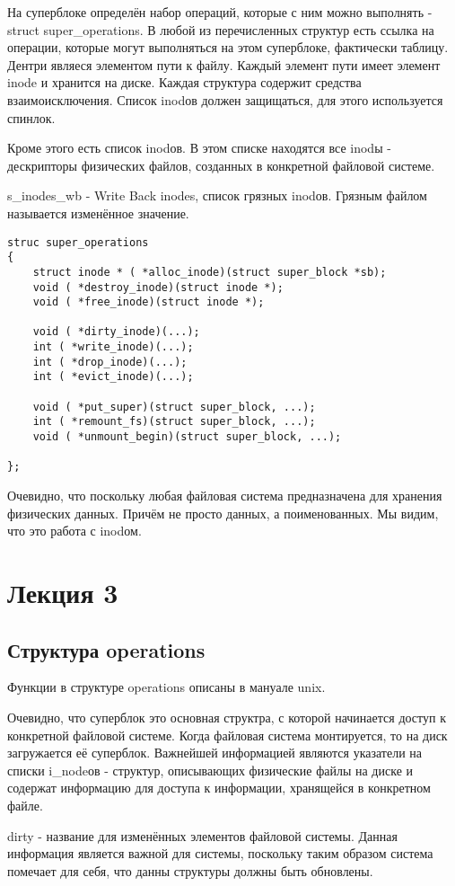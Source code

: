 На суперблоке определён набор операций, которые с ним можно выполнять - struct super\_operations. В любой из перечисленных структур есть ссылка на операции, которые могут выполняться на этом суперблоке, фактически таблицу. Дентри являеся элементом пути к файлу. Каждый элемент пути имеет элемент inode и хранится на диске. Каждая структура содержит средства взаимоисключения. Список inodов должен защищаться, для этого используется спинлок.

Кроме этого есть список inodов. В этом списке находятся все inodы - дескрипторы физических файлов, созданных в конкретной файловой системе. 

s\_inodes\_wb - Write Back inodes, список грязных inodов. Грязным файлом называется изменённое значение.\\
\begin{lstlisting}
struc super_operations
{
	struct inode * ( *alloc_inode)(struct super_block *sb);
	void ( *destroy_inode)(struct inode *);
	void ( *free_inode)(struct inode *);

	void ( *dirty_inode)(...);
	int ( *write_inode)(...);
	int ( *drop_inode)(...);
	int ( *evict_inode)(...);

	void ( *put_super)(struct super_block, ...);
	int ( *remount_fs)(struct super_block, ...);
	void ( *unmount_begin)(struct super_block, ...);
	
};
\end{lstlisting}

Очевидно, что поскольку любая файловая система предназначена для хранения физических данных. Причём не просто данных, а поименованных. Мы видим, что это работа с inodом.

\chapter{Лекция 3}
\section{Структура operations}
Функции в структуре operations описаны в мануале unix.

Очевидно, что суперблок это основная структра, с которой начинается доступ к конкретной файловой системе. Когда файловая система монтируется, то на диск загружается её суперблок. Важнейшей информацией являются указатели на списки i\_nodeов - структур, описывающих физические файлы на диске и содержат информацию для доступа к информации, хранящейся в конкретном файле. 

dirty - название для изменённых элементов файловой системы. Данная информация является важной для системы, поскольку таким образом система помечает для себя, что данны структуры должны быть обновлены. 

